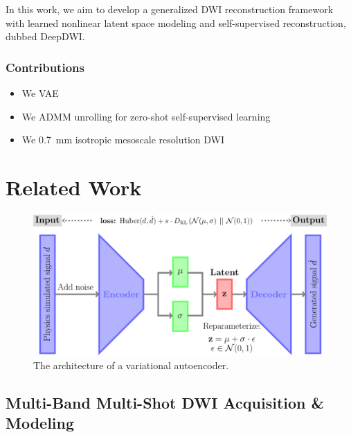 \documentclass[journal,twoside,web]{ieeecolor}
\begin{document}
	In this work,
	we aim to develop a generalized DWI reconstruction framework
	with learned nonlinear latent space modeling and
	self-supervised reconstruction,
	dubbed DeepDWI.
	\subsubsection*{Contributions}
	\begin{itemize}
		\item We VAE
		\item We ADMM unrolling for zero-shot self-supervised learning
		\item We 0.7~mm isotropic mesoscale resolution DWI
	\end{itemize}


	\section{Related Work}

	\begin{figure}
		\centering
		\includegraphics[width=\columnwidth]{../figures/fig1.png}
		\caption{The architecture of a variational autoencoder.
		}
		\label{FIG:MODEL_VAE}
	\end{figure}

	\subsection{Multi-Band Multi-Shot DWI Acquisition \& Modeling}
\end{document}
